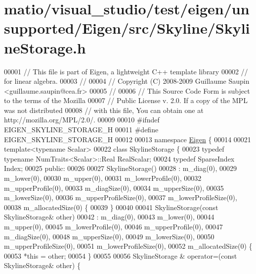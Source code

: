 \hypertarget{matio_2visual__studio_2test_2eigen_2unsupported_2_eigen_2src_2_skyline_2_skyline_storage_8h_source}{}\section{matio/visual\+\_\+studio/test/eigen/unsupported/\+Eigen/src/\+Skyline/\+Skyline\+Storage.h}
\label{matio_2visual__studio_2test_2eigen_2unsupported_2_eigen_2src_2_skyline_2_skyline_storage_8h_source}

\begin{DoxyCode}
00001 \textcolor{comment}{// This file is part of Eigen, a lightweight C++ template library}
00002 \textcolor{comment}{// for linear algebra.}
00003 \textcolor{comment}{//}
00004 \textcolor{comment}{// Copyright (C) 2008-2009 Guillaume Saupin <guillaume.saupin@cea.fr>}
00005 \textcolor{comment}{//}
00006 \textcolor{comment}{// This Source Code Form is subject to the terms of the Mozilla}
00007 \textcolor{comment}{// Public License v. 2.0. If a copy of the MPL was not distributed}
00008 \textcolor{comment}{// with this file, You can obtain one at http://mozilla.org/MPL/2.0/.}
00009 
00010 \textcolor{preprocessor}{#ifndef EIGEN\_SKYLINE\_STORAGE\_H}
00011 \textcolor{preprocessor}{#define EIGEN\_SKYLINE\_STORAGE\_H}
00012 
00013 \textcolor{keyword}{namespace }\hyperlink{namespace_eigen}{Eigen} \{ 
00014 
00021 \textcolor{keyword}{template}<\textcolor{keyword}{typename} Scalar>
00022 \textcolor{keyword}{class }SkylineStorage \{
00023     \textcolor{keyword}{typedef} \textcolor{keyword}{typename} NumTraits<Scalar>::Real RealScalar;
00024     \textcolor{keyword}{typedef} SparseIndex Index;
00025 \textcolor{keyword}{public}:
00026 
00027     SkylineStorage()
00028     : m\_diag(0),
00029     m\_lower(0),
00030     m\_upper(0),
00031     m\_lowerProfile(0),
00032     m\_upperProfile(0),
00033     m\_diagSize(0),
00034     m\_upperSize(0),
00035     m\_lowerSize(0),
00036     m\_upperProfileSize(0),
00037     m\_lowerProfileSize(0),
00038     m\_allocatedSize(0) \{
00039     \}
00040 
00041     SkylineStorage(\textcolor{keyword}{const} SkylineStorage& other)
00042     : m\_diag(0),
00043     m\_lower(0),
00044     m\_upper(0),
00045     m\_lowerProfile(0),
00046     m\_upperProfile(0),
00047     m\_diagSize(0),
00048     m\_upperSize(0),
00049     m\_lowerSize(0),
00050     m\_upperProfileSize(0),
00051     m\_lowerProfileSize(0),
00052     m\_allocatedSize(0) \{
00053         *\textcolor{keyword}{this} = other;
00054     \}
00055 
00056     SkylineStorage & operator=(\textcolor{keyword}{const} SkylineStorage& other) \{

\end{DoxyCode}
